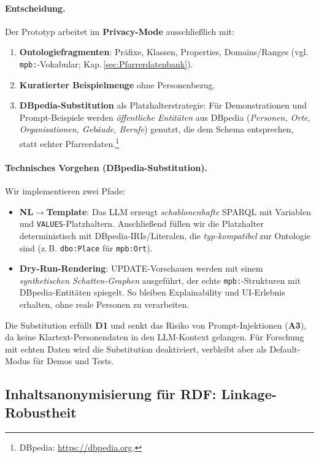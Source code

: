 \paragraph{Entscheidung.}
Der Prototyp arbeitet im \textbf{Privacy-Mode} ausschließlich mit:
\begin{enumerate}
  \item \textbf{Ontologiefragmenten}: Präfixe, Klassen, Properties, Domains/Ranges (vgl. \texttt{mpb:}-Vokabular; Kap.\,\ref{sec:Pfarrerdatenbank}).
  \item \textbf{Kuratierter Beispielmenge} ohne Personenbezug.
  \item \textbf{DBpedia-Substitution} als Platzhalterstrategie: Für Demonstrationen und Prompt-Beispiele werden \emph{öffentliche Entitäten} aus DBpedia (\emph{Personen, Orte, Organisationen, Gebäude, Berufe}) genutzt, die dem Schema entsprechen, statt echter Pfarrerdaten.\footnote{DBpedia: \url{https://dbpedia.org}.}
\end{enumerate}

\paragraph{Technisches Vorgehen (DBpedia-Substitution).}
Wir implementieren zwei Pfade:

\begin{itemize}
  \item \textbf{NL$\rightarrow$Template}: Das LLM erzeugt \emph{schablonenhafte} SPARQL mit Variablen und \texttt{VALUES}-Platzhaltern. Anschließend füllen wir die Platzhalter deterministisch mit DBpedia-IRIs/Literalen, die \emph{typ-kompatibel} zur Ontologie sind (z.\,B. \texttt{dbo:Place} für \texttt{mpb:Ort}). 
  \item \textbf{Dry-Run-Rendering}: UPDATE-Vorschauen werden mit einem \emph{synthetischen Schatten-Graphen} ausgeführt, der echte \texttt{mpb:}-Strukturen mit DBpedia-Entitäten spiegelt. So bleiben Explainability und UI-Erlebnis erhalten, ohne reale Personen zu verarbeiten.
\end{itemize}

Die Substitution erfüllt \textbf{D1} und senkt das Risiko von Prompt-Injektionen (\textbf{A3}), da keine Klartext-Personendaten in den LLM-Kontext gelangen. Für Forschung mit echten Daten wird die Substitution deaktiviert, verbleibt aber als Default-Modus für Demos und Tests.

\subsection{Inhaltsanonymisierung für RDF: Linkage-Robustheit}
\label{subsec:content-anon}

